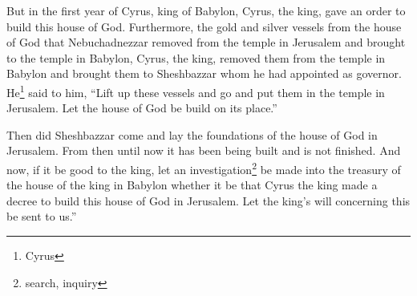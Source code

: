 \begin{inparaenum}
     But in the first year of Cyrus, king of Babylon, Cyrus, the king, gave an order to build this house of God.%
     Furthermore, the gold and silver vessels from the house of God that Nebuchadnezzar removed from the temple in Jerusalem and brought to the temple in Babylon, Cyrus, the king, removed them from the temple in Babylon and brought them to Sheshbazzar whom he had appointed as governor.%
     He\footnote{Cyrus} said to him, ``Lift up these vessels and go and put them in the temple in Jerusalem. Let the house of God be build on its place.''%
    
     Then did Sheshbazzar come and lay the foundations of the house of God in Jerusalem. From then until now it has been being built and is not finished.%
     And now, if it be good to the king, let an investigation\footnote{search, inquiry} be made into the treasury of the house of the king in Babylon whether it be that Cyrus the king made a decree to build this house of God in Jerusalem. Let the king's will concerning this be sent to us.''%
\end{inparaenum}
